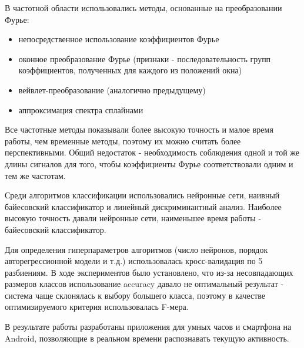 В частотной области использовались методы, основанные на преобразовании Фурье:
\begin{itemize}
\item непосредственное использование коэффициентов Фурье
\item оконное преобразование Фурье (признаки - последовательность групп коэффициентов, полученных для каждого из положений окна)
\item вейвлет-преобразование (аналогично предыдущему)
\item аппроксимация спектра сплайнами
\end{itemize}
Все частотные методы показывали более высокую точность и малое время работы, чем временные методы, поэтому их можно считать более перспективными. Общий недостаток - необходимость соблюдения одной и той же длины сигналов для того, чтобы коэффициенты Фурье соответствовали одним и тем же частотам.

Среди алгоритмов классификации использовались нейронные сети, наивный байесовский классификатор и линейный дискриминантный анализ. Наиболее высокую точность давали нейронные сети, наименьшее время работы - байесовский классификатор.

Для определения гиперпараметров алгоритмов (число нейронов, порядок авторегрессионной модели и т.д.) использовалась кросс-валидация по 5 разбиениям. В ходе экспериментов было установлено, что из-за несовпадающих размеров классов использование accuracy давало не оптимальный результат - система чаще склонялась к выбору большего класса, поэтому в качестве оптимизируемого критерия использовалась F-мера.


В результате работы разработаны приложения для умных часов и смартфона на Android, позволяющие в реальном времени распознавать текущую активность.


